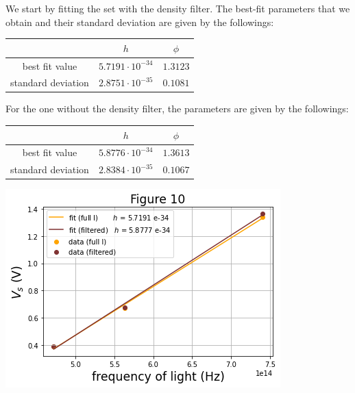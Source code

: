 \documentclass[11pt]{book}
\theoremstyle{break}
\theoremstyle{break}
\begin{document}
We start by fitting the set with the density filter. The best-fit parameters that we obtain  and their standard deviation are given by the followings:
\begin{center}
\begin{tabular}{|c|c|c|}
\hline
 & $h$ & $\phi$ \\
\hline 
best fit value & $5.7191\cdot 10^{-34}$ & $1.3123$\\
\hline
standard deviation & $2.8751 \cdot 10^{-35}$ & $0.1081$\\
\hline
\end{tabular}
\end{center}
For the one without the density filter, the parameters are given by the followings:
\begin{center}
\begin{tabular}{|c|c|c|}
\hline
 & $h$ & $\phi$ \\
\hline 
best fit value & $5.8776\cdot 10^{-34}$ & $1.3613$\\
\hline
standard deviation & $2.8384 \cdot 10^{-35}$ & $0.1067$\\
\hline
\end{tabular}
\end{center}


\begin{center}
\includegraphics[scale=0.5]{fig10.png}
\end{center}
\end{document}
